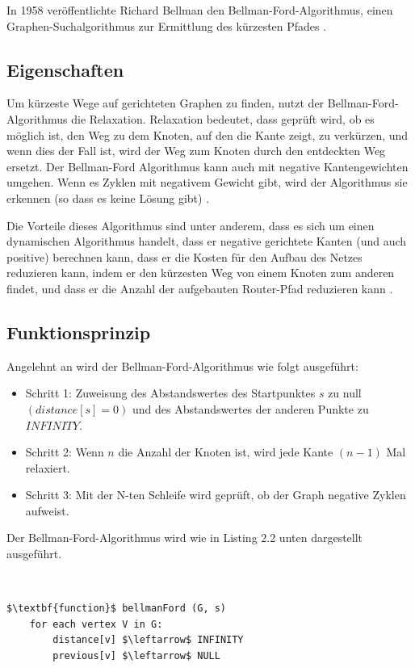 In 1958 veröffentlichte Richard Bellman den Bellman-Ford-Algorithmus, einen Graphen-Suchalgorithmus zur Ermittlung des kürzesten 
Pfades \cite{Abusalim2020,Sulaiman18}.
\subsection{Eigenschaften}
Um kürzeste Wege auf gerichteten Graphen zu finden, nutzt der Bellman-Ford-Algorithmus die Relaxation.
Relaxation bedeutet, dass geprüft wird, ob es möglich ist, den Weg zu dem Knoten, auf den die Kante zeigt, zu verkürzen, 
und wenn dies der Fall ist, wird der Weg zum Knoten durch den entdeckten Weg ersetzt.
Der Bellman-Ford Algorithmus kann auch mit negative Kantengewichten umgehen. 
Wenn es Zyklen mit negativem Gewicht gibt, wird der Algorithmus sie erkennen (so dass es keine Lösung gibt) \cite{Vaibhavi2014}.

Die Vorteile dieses Algorithmus sind unter anderem, dass es sich um einen dynamischen Algorithmus handelt, dass er negative gerichtete 
Kanten (und auch positive) berechnen kann, dass er die Kosten für den Aufbau des Netzes reduzieren kann, indem er den kürzesten Weg von einem 
Knoten zum anderen findet, und dass er die Anzahl der aufgebauten Router-Pfad reduzieren kann \cite{Abusalim2020}.

\subsection{Funktionsprinzip}

Angelehnt an \cite{Abusalim2020} wird der Bellman-Ford-Algorithmus wie folgt ausgeführt:
\\
\begin{itemize}
	\item Schritt 1: Zuweisung des Abstandswertes des Startpunktes $s$ zu null $(distance[s] = 0)$ und des Abstandswertes der anderen Punkte zu 
		$INFINITY$.
	\item Schritt 2: Wenn $n$ die Anzahl der Knoten ist, wird jede Kante $(n - 1)$ Mal relaxiert. 
	\item Schritt 3: Mit der N-ten Schleife wird geprüft, ob der Graph negative Zyklen aufweist.
\end{itemize}
Der Bellman-Ford-Algorithmus wird wie in Listing 2.2 unten dargestellt ausgeführt.

\noindent \\
\begin{minipage}{1.0\textwidth} \small
\begin{lstlisting}[label=lst:Bellman-Ford]
$\textbf{function}$ bellmanFord (G, s)
	for each vertex V in G:
		distance[v] $\leftarrow$ INFINITY
		previous[v] $\leftarrow$ NULL
		
\end{lstlisting}
\end{minipage}


